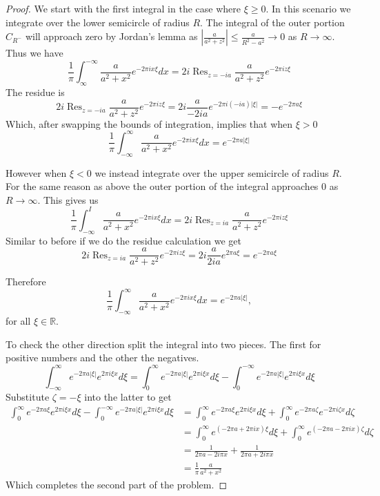 \documentclass[10pt]{article}
\newcommand{\bb}[1]{\mathbb{#1}}
\DeclareMathOperator{\res}{Res}
\theoremstyle{plain}
\theoremstyle{remark}
\begin{document}
\begin{proof}
  We start with the first integral in the case where $\xi\geq 0$. In this scenario
  we integrate over the lower semicircle of radius $R$. The integral of the
  outer portion $C_{R^-}$ will approach zero by Jordan's lemma as
  $|\frac{a}{a^2+z^2}|\leq\frac{a}{R^2-a^2}\rightarrow 0 $ as $R\rightarrow\infty$. Thus we have
  \[
    \frac{1}{\pi}\int_\infty^{-\infty}\frac{a}{a^2 + x^2}e^{-2\pi ix\xi}dx = 2 i \res_{z=-ia}\frac{a}{a^2 + z^2}e^{-2\pi iz\xi}
  \]
  The residue is
  \[
    2i\res_{z=-ia}\frac{a}{a^2 + z^2}e^{-2\pi iz\xi}=2i\frac{a}{-2ia}e^{-2\pi i(-ia)|\xi|} = -e^{-2\pi a\xi}
  \]
  Which, after swapping the bounds of integration, implies that when $\xi>0$
  \[
    \frac{1}{\pi} \int_{-\infty}^\infty \frac{a}{a^2 + x^2}e^{-2\pi ix\xi}dx = e^{-2\pi a |\xi|}
  \]

  However when $\xi<0$ we instead integrate over the upper semicircle of radius $R$. For the
  same reason as above the outer portion of the integral approaches 0 as $R\rightarrow\infty$. This gives
  us
  \[
    \frac{1}{\pi}\int_{-\infty}^I\frac{a}{a^2 + x^2}e^{-2\pi ix\xi} dx = 2 i \res_{z=ia}\frac{a}{a^2 + z^2}e^{-2\pi iz\xi}
  \]
  Similar to before if we do the residue calculation we get
  \[
    2 i \res_{z=ia}\frac{a}{a^2 + z^2}e^{-2\pi iz\xi}= 2 i \frac{a}{2ia}e^{2\pi a\xi}=e^{-2\pi a\xi}
  \]

  Therefore
  \[
    \frac{1}{\pi} \int_{-\infty}^\infty \frac{a}{a^2 + x^2}e^{-2\pi ix\xi}dx = e^{-2\pi a |\xi|},
  \]
  for all $\xi\in \bb{R}$.

  To check the other direction split the integral into two pieces. The first
  for positive numbers and the other the negatives.
  \[
    \int_{-\infty}^\infty e^{-2\pi a|\xi|}e^{2\pi i\xi x}d\xi = \int_0^\infty e^{-2\pi a|\xi|}e^{2\pi i\xi x}d\xi-\int_{0}^{-\infty} e^{-2\pi a|\xi|}e^{2\pi i\xi x}d\xi
  \]
  Substitute $\zeta=-\xi$ into the latter to get
  \begin{align*}
    \int_0^\infty e^{-2\pi a\xi}e^{2\pi i\xi x}d\xi-\int_{0}^{-\infty} e^{-2\pi a|\xi|}e^{2\pi i\xi x}d\xi &= \int_0^\infty e^{-2\pi a\xi}e^{2\pi i\xi x}d\xi+\int_{0}^{\infty} e^{-2\pi a\zeta}e^{-2\pi i\zeta x}d\zeta\\
                                                                                      &= \int_0^\infty e^{(-2\pi a+2\pi i x)\xi}d\xi+\int_{0}^{\infty} e^{(-2\pi a-2\pi ix)\zeta}d\zeta\\
                                                                                      &=\frac{1}{2\pi a-2i\pi x}+\frac{1}{2\pi a+2i\pi x}\\
                                                                                      &=\frac{1}{\pi}\frac{a}{a^2+x^2}
  \end{align*}
  Which completes the second part of the problem.
\end{proof}
\end{document}

